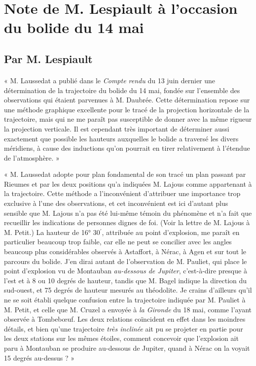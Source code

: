 \documentclass[a4paper, 11pt, oneside, polutonikogreek, french]{article}
\begin{document}
\section{Note de M. Lespiault à l'occasion du bolide du 14 mai}
\subsection*{Par M. Lespiault}
\paragraph{}
« M. Laussedat a publié dans le \emph{Compte rendu} du 13 juin dernier une détermination de la trajectoire du bolide du 14 mai, fondée sur l'ensemble des observations qui étaient parvenues à M. Daubrée. Cette détermination repose sur une méthode graphique excellente pour le tracé de la projection horizontale de la trajectoire, mais qui ne me paraît pas susceptible de donner avec la même rigueur la projection verticale. Il est cependant très important de déterminer aussi exactement que possible les hauteurs auxquelles le bolide a traversé les divers méridiens, à cause des inductions qu'on pourrait en tirer relativement à l'étendue de l'atmosphère. »

« M. Laussedat adopte pour plan fondamental de son tracé un plan passant par Rieumes et par les deux positions qu'a indiquées M. Lajous comme appartenant à la trajectoire. Cette méthode a l'inconvénient d'attribuer une importance trop exclusive à l'une des observations, et cet inconvénient est ici d'autant plus sensible que M. Lajous n'a pas été lui-même témoin du phénomène et n'a fait que recueillir les indications de personnes dignes de foi. (Voir la lettre de M. Lajous à M. Petit.) La hauteur de 16° 30$^{\prime}$, attribuée au point d'explosion, me paraît en particulier beaucoup trop faible, car elle ne peut se concilier avec les angles beaucoup plus considérables observés à Astaffort, à Nérac, à Agen et sur tout le parcours du bolide. J'en dirai autant de l'observation de M. Pauliet, qui place le point d'explosion vu de Montauban \emph{au-dessous de Jupiter}, c'est-à-dire presque à l'est et à 8 ou 10 degrés de hauteur, tandis que M. Bagel indique la direction du sud-ouest, et 75 degrés de hauteur mesurés au théodolite. Je crains d'ailleurs qu'il ne se soit établi quelque confusion entre la trajectoire indiquée par M. Pauliet à M. Petit, et celle que M. Cruzel a envoyée à \emph{la Gironde} du 18 mai, comme l'ayant observée à Tombebœuf. Les deux relations coïncident en effet dans les moindres détails, et bien qu'une trajectoire \emph{très inclinée} ait pu se projeter en partie pour les deux stations sur les mêmes étoiles, comment concevoir que l'explosion ait paru à Montauban se produire au-dessous de Jupiter, quand à Nérac on la voyait 15 degrés au-dessus ? »
\end{document}
